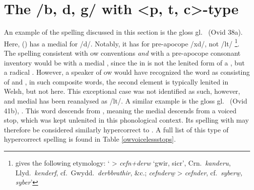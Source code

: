
\section{The /b, d, g/ with <p, t, c>-type}
\label{bdgwithptc}
An example of the spelling discussed in this section is the gloss  gl.\  (Ovid 38a). Here,   () has a medial  for /d/. Notably, it has  for pre-apocope /\gls{x}d/, not /\gls{l}t/%
\footnote{\textcite[s.v.\ ]{bevan_geiriadur_2014} gives the following etymology: `\textwelsh{ > \textit{cefn+derw} ‘gwir, sicr’, Crn.\ \textit{kanderu}, Llyd.\ \textit{kenderf}, cf.\ Gwydd.\ \textit{derbbrathir}, \&c.; \textit{cefnderw̯} > \textit{cefnder}, cf.\ \textit{syberw̯, syber}}'}. 
The spelling consistent with \gls{ow} conventions \emph{and} with a pre-apocope consonant inventory would be with a medial , since the  in  is not the lenited form of a , but a radical . However, a speaker of \gls{ow} would have recognized the word as consisting of  and , in such composite words, the second element is typically lenited in Welsh, but not here. This exceptional case was not identified as such, however, and medial  has been reanalysed as /\gls{l}t/. A similar example is the gloss  gl.\  (Ovid 41b), . This word descends from , meaning the medial  descends from a voiced stop, which was kept unlenited in this phonological context. Its spelling with  may therefore be considered similarly hypercorrect to . A full list of this type of hypercorrect spelling is found in Table \ref{owvoicelessstops}. 

